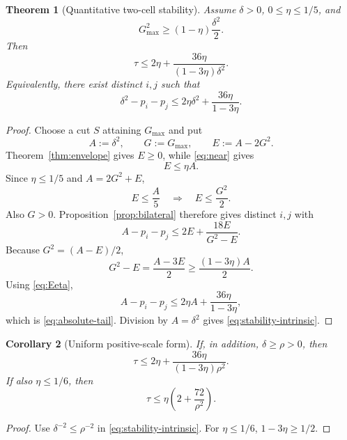 \documentclass[11pt]{article}
\newtheorem{theorem}{Theorem}[section]
\newtheorem{corollary}[theorem]{Corollary}
\newcommand{\gmax}{G_{\max}}
\newcommand{\dd}{\delta}
\begin{document}
\begin{theorem}[Quantitative two-cell stability]\label{thm:stability}
Assume $\dd>0$, $0\le\eta\le1/5$, and
\begin{equation}\label{eq:near}
  \gmax^2\ge(1-\eta)\frac{\dd^2}{2}.
\end{equation}
Then
\begin{equation}\label{eq:stability-intrinsic}
  \boxed{
  \tau\le
  2\eta+\frac{36\eta}{(1-3\eta)\dd^2}.
  }
\end{equation}
Equivalently, there exist distinct $i,j$ such that
\begin{equation}\label{eq:absolute-tail}
  \dd^2-p_i-p_j
  \le
  2\eta\dd^2+\frac{36\eta}{1-3\eta}.
\end{equation}
\end{theorem}

\begin{proof}
Choose a cut $S$ attaining $\gmax$ and put
\[
  A:=\dd^2,\qquad G:=\gmax,\qquad E:=A-2G^2.
\]
Theorem~\ref{thm:envelope} gives $E\ge0$, while
\eqref{eq:near} gives
\begin{equation}\label{eq:Eeta}
  E\le\eta A.
\end{equation}
Since $\eta\le1/5$ and $A=2G^2+E$,
\[
  E\le\frac A5
  \quad\Longrightarrow\quad
  E\le\frac{G^2}{2}.
\]
Also $G>0$.  Proposition~\ref{prop:bilateral} therefore gives distinct
$i,j$ with
\[
  A-p_i-p_j
  \le
  2E+\frac{18E}{G^2-E}.
\]
Because $G^2=(A-E)/2$,
\[
  G^2-E=\frac{A-3E}{2}
  \ge\frac{(1-3\eta)A}{2}.
\]
Using \eqref{eq:Eeta},
\[
  A-p_i-p_j
  \le
  2\eta A+\frac{36\eta}{1-3\eta},
\]
which is \eqref{eq:absolute-tail}.  Division by $A=\dd^2$ gives
\eqref{eq:stability-intrinsic}.
\end{proof}

\begin{corollary}[Uniform positive-scale form]\label{cor:rho}
If, in addition, $\dd\ge\rho>0$, then
\begin{equation}\label{eq:rho}
  \tau\le
  2\eta+\frac{36\eta}{(1-3\eta)\rho^2}.
\end{equation}
If also $\eta\le1/6$, then
\begin{equation}\label{eq:linear}
  \tau\le
  \eta\left(2+\frac{72}{\rho^2}\right).
\end{equation}
\end{corollary}

\begin{proof}
Use $\dd^{-2}\le\rho^{-2}$ in
\eqref{eq:stability-intrinsic}.  For $\eta\le1/6$,
$1-3\eta\ge1/2$.
\end{proof}
\end{document}
